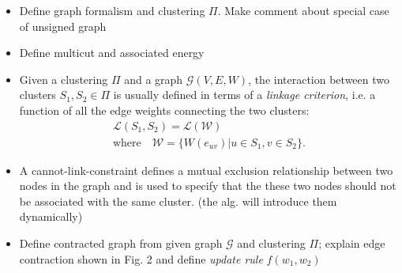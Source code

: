 \begin{itemize}
\item Define graph formalism and clustering $\Pi$. Make comment about special case of unsigned graph
\item Define multicut and associated energy

\item Given a clustering $\Pi$ and a graph $\mathcal{G}(V,E,W)$, the interaction between two clusters $S_1, S_2 \in \Pi$ is usually defined in terms of a \emph{linkage criterion}, i.e. a function of all the edge weights connecting the two clusters:
\begin{equation} \label{eq:linkage_criterion_def}
\begin{gathered}
\mathcal{L}(S_1,S_2) = \mathcal{L}(\mathcal{W})\quad \\
   \text{where} \quad \mathcal{W} = \{ W(e_{uv})| u\in S_1, v\in S_2 \}.
\end{gathered}
\end{equation}

\item A cannot-link-constraint defines a mutual exclusion relationship between two nodes in the graph and is used to specify that the these two nodes should not be associated with the same cluster. (the alg. will introduce them dynamically)
\item Define contracted graph from given graph  $\mathcal{G}$ and clustering $\Pi$; explain edge contraction shown in Fig. 2 and define \emph{update rule} $f(w_1, w_2)$

\end{itemize}


